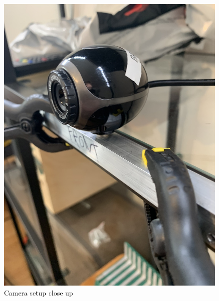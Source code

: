          \begin{figure}[H] 
            \centering
            \includegraphics[scale=0.17]{images/experiment_4/IMG_1324.jpg}
              \caption{Camera setup close up}
            \label{fig:camera_setup2}
     \end{figure}
     
